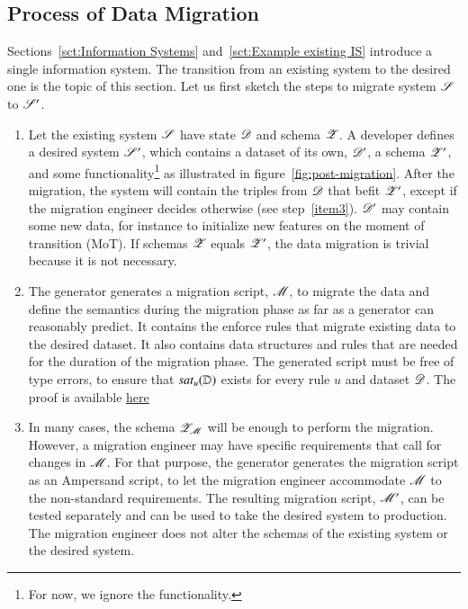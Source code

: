 \documentclass{elsarticle}
\begin{document}
\subsection{Process of Data Migration}
   Sections~\ref{sct:Information Systems} and~\ref{sct:Example existing IS} introduce a single information system.
   The transition from an existing system to the desired one is the topic of this section.
   Let us first sketch the steps to migrate system $\mathscr{S}$ to $\mathscr{S}'$.
\begin{enumerate}
   \item Let the existing system $\mathscr{S}$ have state $\mathscr{D}$ and schema $\mathscr{Z}$.
         A developer defines a desired system $\mathscr{S}'$, which contains a dataset of its own, $\mathscr{D}'$, a schema $\mathscr{Z}'$, and some functionality\footnote{For now, we ignore the functionality.} as illustrated in figure~\ref{fig:post-migration}.
         After the migration, the system will contain the triples from $\mathscr{D}$ that befit $\mathscr{Z}'$,
         except if the migration engineer decides otherwise (see step~\ref{item3}).
         $\mathscr{D}'$ may contain some new data,
         for instance to initialize new features on the moment of transition (MoT).
         If schemas $\mathscr{Z}$ equals $\mathscr{Z}'$, the data migration is trivial because it is not necessary.
   \item The generator generates a migration script, $\mathscr{M}$,
         to migrate the data and define the semantics during the migration phase as far as a generator can reasonably predict.
         It contains the enforce rules that migrate existing data to the desired dataset.
         It also contains data structures and rules that are needed for the duration of the migration phase.
         The generated script must be free of type errors, to ensure that $\text{\it sat\/}_{u}(\mathbb{D})$ exists for every rule $u$ and dataset $\mathscr{D}$.
         The proof is available \href{https://www.isa-afp.org/}{here}
   \item\label{item3}
         In many cases, the schema $\mathscr{Z}_{\mathscr{M}}$ will be enough to perform the migration.
         However, a migration engineer may have specific requirements that call for changes in $\mathscr{M}$.
         For that purpose, the generator generates the migration script as an Ampersand script,
         to let the migration engineer accommodate $\mathscr{M}$ to the non-standard requirements.
         The resulting migration script, $\mathscr{M}'$, can be tested separately and can be used to take the desired system to production.
         The migration engineer does not alter the schemas of the existing system or the desired system.

\end{enumerate}
\end{document}
